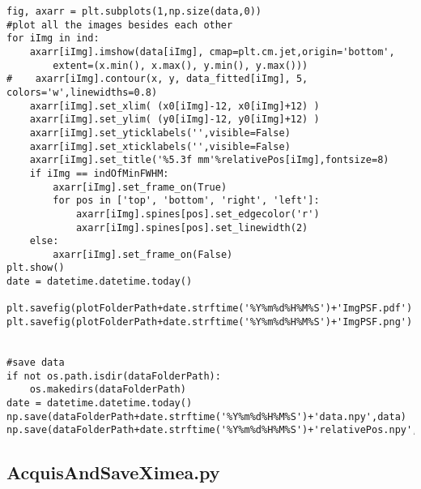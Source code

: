 \begin{lstlisting}
fig, axarr = plt.subplots(1,np.size(data,0))
#plot all the images besides each other
for iImg in ind:
    axarr[iImg].imshow(data[iImg], cmap=plt.cm.jet,origin='bottom',
        extent=(x.min(), x.max(), y.min(), y.max()))
#    axarr[iImg].contour(x, y, data_fitted[iImg], 5, colors='w',linewidths=0.8)
    axarr[iImg].set_xlim( (x0[iImg]-12, x0[iImg]+12) )
    axarr[iImg].set_ylim( (y0[iImg]-12, y0[iImg]+12) )
    axarr[iImg].set_yticklabels('',visible=False)
    axarr[iImg].set_xticklabels('',visible=False)
    axarr[iImg].set_title('%5.3f mm'%relativePos[iImg],fontsize=8)
    if iImg == indOfMinFWHM:
        axarr[iImg].set_frame_on(True)
        for pos in ['top', 'bottom', 'right', 'left']:
            axarr[iImg].spines[pos].set_edgecolor('r')
            axarr[iImg].spines[pos].set_linewidth(2)
    else:
        axarr[iImg].set_frame_on(False)
plt.show()
date = datetime.datetime.today()

plt.savefig(plotFolderPath+date.strftime('%Y%m%d%H%M%S')+'ImgPSF.pdf')
plt.savefig(plotFolderPath+date.strftime('%Y%m%d%H%M%S')+'ImgPSF.png')


#save data
if not os.path.isdir(dataFolderPath):
    os.makedirs(dataFolderPath)
date = datetime.datetime.today()
np.save(dataFolderPath+date.strftime('%Y%m%d%H%M%S')+'data.npy',data)
np.save(dataFolderPath+date.strftime('%Y%m%d%H%M%S')+'relativePos.npy',relativePos)
\end{lstlisting}

\subsection{AcquisAndSaveXimea.py}
\label{subapp:AcquisAndSaveXimea}

